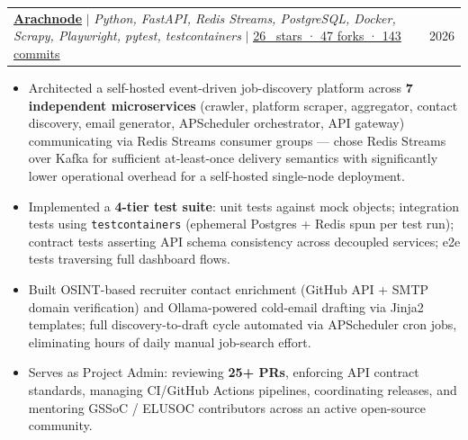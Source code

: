 \documentclass[letterpaper,10pt]{article}
\makeatletter
\newcommand{\resumeItem}[1]{
  \item\small{{#1 \vspace{-2pt}}}
}
\newcommand{\resumeProjectHeading}[2]{
    \item
    \begin{tabular*}{0.97\textwidth}{l@{\extracolsep{\fill}}r}
      \small#1 & \small#2 \\
    \end{tabular*}\vspace{-7pt}
}
\newcommand{\resumeItemListStart}{\begin{itemize}[leftmargin=0.2in, itemsep=-1pt, topsep=0pt]}
\newcommand{\resumeItemListEnd}{\end{itemize}\vspace{-4pt}}
\makeatother
\begin{document}
  \resumeProjectHeading
    {\textbf{\href{https://github.com/sharmavaibhav31/arachnode}{Arachnode}} $|$ \textit{Python, FastAPI, Redis Streams, PostgreSQL, Docker, Scrapy, Playwright, pytest, testcontainers} $|$ \href{https://github.com/sharmavaibhav31/arachnode}{\underline{26 \faGithub\ stars · 47 forks · 143 commits}}}{2026}
  \resumeItemListStart
    \resumeItem{Architected a self-hosted event-driven job-discovery platform across \textbf{7 independent microservices} (crawler, platform scraper, aggregator, contact discovery, email generator, APScheduler orchestrator, API gateway) communicating via Redis Streams consumer groups — chose Redis Streams over Kafka for sufficient at-least-once delivery semantics with significantly lower operational overhead for a self-hosted single-node deployment.}
    \resumeItem{Implemented a \textbf{4-tier test suite}: unit tests against mock objects; integration tests using \texttt{testcontainers} (ephemeral Postgres + Redis spun per test run); contract tests asserting API schema consistency across decoupled services; e2e tests traversing full dashboard flows.}
    \resumeItem{Built OSINT-based recruiter contact enrichment (GitHub API + SMTP domain verification) and Ollama-powered cold-email drafting via Jinja2 templates; full discovery-to-draft cycle automated via APScheduler cron jobs, eliminating hours of daily manual job-search effort.}
    \resumeItem{Serves as Project Admin: reviewing \textbf{25+ PRs}, enforcing API contract standards, managing CI/GitHub Actions pipelines, coordinating releases, and mentoring GSSoC / ELUSOC contributors across an active open-source community.}
  \resumeItemListEnd
\end{document}
